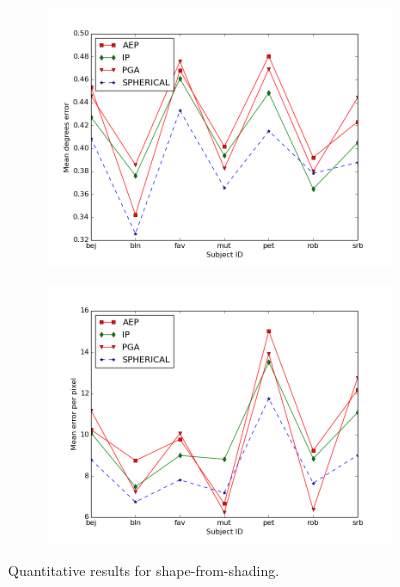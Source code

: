 \begin{figure}[t]
    \centering
    \begin{subfigure}{0.49\textwidth}
        \centering
        \includegraphics[width=\textwidth]{statistical_normals/images/gsfs_results/sfs-angle}
\label{fig:sfs-angle}
    \end{subfigure}
    \begin{subfigure}{0.49\textwidth}
        \centering
        \includegraphics[width=\textwidth]{statistical_normals/images/gsfs_results/sfs-height}
\label{fig:sfs-height}
    \end{subfigure}
    \caption{Quantitative results for shape-from-shading.}
\label{fig:sfs-results-quant}
\end{figure}
